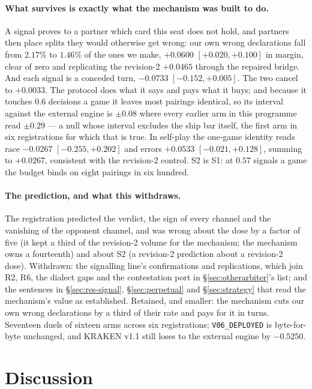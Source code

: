 \documentclass[11pt,letterpaper]{article}
\begin{document}
\paragraph{What survives is exactly what the mechanism was built to do.} A
signal proves to a partner which card this seat does not hold, and partners
then place splits they would otherwise get wrong: our own wrong declarations
fall from $2.17\%$ to $1.46\%$ of the ones we make, $+0.0600$
$[+0.020, +0.100]$ in margin, clear of zero and replicating the revision-2
$+0.0465$ through the repaired bridge. And each signal is a conceded turn,
$-0.0733$ $[-0.152, +0.005]$. The two cancel to $+0.0033$. The protocol does
what it says and pays what it buys; and because it touches $0.6$ decisions a
game it leaves most pairings identical, so its interval against the external engine is
$\pm 0.08$ where every earlier arm in this programme read $\pm 0.29$ --- a
null whose interval excludes the ship bar itself, the first arm in six
registrations for which that is true. In self-play the one-game identity
reads race $-0.0267$ $[-0.255, +0.202]$ and errors $+0.0533$
$[-0.021, +0.128]$, summing to $+0.0267$, consistent with the revision-2
control. S2 is S1: at $0.57$ signals a game the budget binds on eight
pairings in six hundred.

\paragraph{The prediction, and what this withdraws.} The registration
predicted the verdict, the sign of every channel and the vanishing of the
opponent channel, and was wrong about the dose by a factor of five (it kept a
third of the revision-2 volume for the mechanism; the mechanism owns a
fourteenth) and about S2 (a revision-2 prediction about a revision-2 dose).
Withdrawn: the signalling line's confirmations and replications, which join
R2, R6, the dialect gaps and the contestation port in
\S\ref{sec:otherarbiter}'s list; and the sentences in \S\ref{sec:res-signal},
\S\ref{sec:perpetual} and \S\ref{sec:strategy} that read the mechanism's
value as established. Retained, and smaller: the mechanism cuts our own wrong
declarations by a third of their rate and pays for it in turns. Seventeen
duels of sixteen arms across six registrations; \texttt{V06\_DEPLOYED} is
byte-for-byte unchanged, and KRAKEN v1.1 still loses to the external engine by
$-0.5250$.


\section{Discussion}
\end{document}
